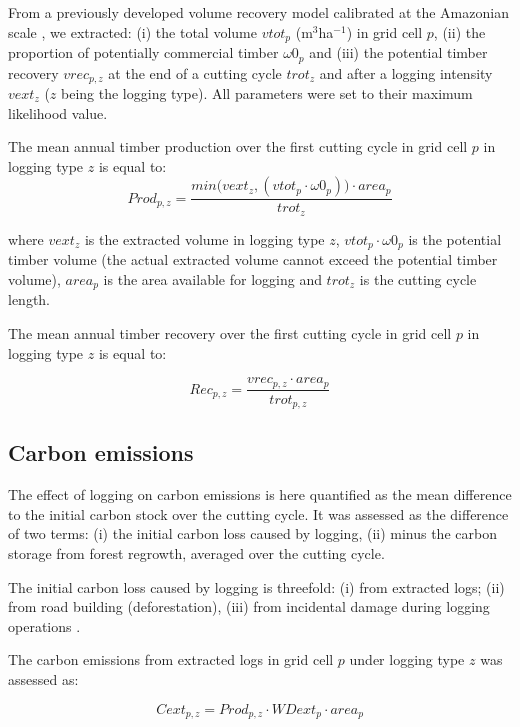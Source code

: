 \documentclass{article}
\begin{document}
From a previously developed volume recovery model calibrated at the Amazonian scale \cite{Piponiotc}, we extracted: (i) the total volume $vtot_p$ (m$^3$ha$^{-1}$) in grid cell $p$, (ii) the proportion of potentially commercial timber $\omega 0_p$ and (iii) the potential timber recovery $vrec_{p,z}$ at the end of a cutting cycle $trot_z$ and after a logging intensity $vext_z$ ($z$ being the logging type). All parameters were set to their maximum likelihood value.

The mean annual timber production over the first cutting cycle in grid cell $p$ in logging type $z$ is equal to: 
\begin{equation}
\label{eq:prod}
    Prod_{p,z}  =  \frac{min\big(vext_z, (vtot_p\cdot \omega 0_p) \big) \cdot area_p}{trot_z}
\end{equation}

where $vext_z$ is the extracted volume in logging type $z$, $vtot_p\cdot \omega 0_p$ is the potential timber volume (the actual extracted volume cannot exceed the potential timber volume), $area_p$ is the area available for logging and $trot_z$ is the cutting cycle length.

The mean annual timber recovery over the first cutting cycle in grid cell $p$ in logging type $z$ is equal to: 

\begin{equation}
\label{eq:rec}
    Rec_{p,z} = \frac{vrec_{p,z}\cdot area_p}{trot_{p,z}}
\end{equation}

\subsection{Carbon emissions}

The effect of logging on carbon emissions is here quantified as the mean difference to the initial carbon stock over the cutting cycle. It was assessed as the difference of two terms: (i) the initial carbon loss caused by logging, (ii) minus the carbon storage from forest regrowth, averaged over the cutting cycle. 

The initial carbon loss caused by logging is threefold: (i) from extracted logs; (ii) from road building (deforestation), (iii) from incidental damage during logging operations \cite{Piponiot2016}. 

The carbon emissions from extracted logs in grid cell $p$ under logging type $z$ was assessed as: 

\begin{equation}
\label{eq:cext}
    Cext_{p,z} = Prod_{p,z} \cdot WDext_p \cdot  area_p
\end{equation}
\end{document}
